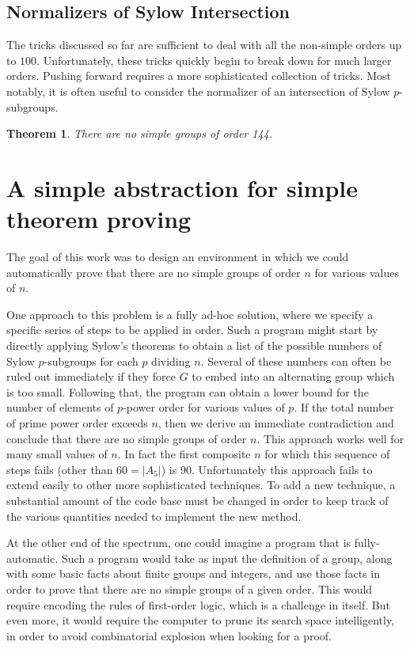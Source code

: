 \documentclass[11pt, oneside]{article}   	%
\newtheorem{theorem}{Theorem}
\begin{document}
\subsection{Normalizers of Sylow Intersection}

The tricks discussed so far are sufficient to deal with all the non-simple orders up to $100.$  %
Unfortunately, these tricks quickly begin to break down for much larger orders.  Pushing forward requires a more sophisticated collection of tricks.  Most notably, it is often useful to consider the normalizer of an intersection of Sylow $p$-subgroups.

\begin{theorem}
There are no simple groups of order 144.
\end{theorem}


\section{A simple abstraction for simple theorem proving}

The goal of this work was to design an environment in which we could automatically prove that there are no simple groups of order $n$ for various values of $n$.  

One approach to this problem is a fully ad-hoc solution, where we specify a specific series of steps to be applied in order.  Such a program might start by directly applying Sylow's theorems to obtain a list of the possible numbers of Sylow $p$-subgroups for each $p$ dividing $n$.  Several of these numbers can often be ruled out immediately if they force $G$ to embed into an alternating group which is too small.  Following that, the program can obtain a lower bound for the number of elements of $p$-power order for various values of $p$.  If the total number of prime power order exceeds $n$, then we derive an immediate contradiction and conclude that there are no simple groups of order $n$.  This approach works well for many small values of $n$.  In fact the first composite $n$ for which this sequence of steps fails (other than $60 = |A_5|$) is $90.$ Unfortunately this approach fails to extend easily to other more sophisticated techniques.  To add a new technique, a substantial amount of the code base must be changed in order to keep track of the various quantities needed to implement the new method.

At the other end of the spectrum, one could imagine a program that is fully-automatic.  Such a program would take as input the definition of a group, along with some basic facts about finite groups and integers, and use those facts in order to prove that there are no simple groups of a given order.  This would require encoding the rules of first-order logic, which is a challenge in itself.  But even more, it would require the computer to prune its search space intelligently, in order to avoid combinatorial explosion when looking for a proof.
\end{document}
